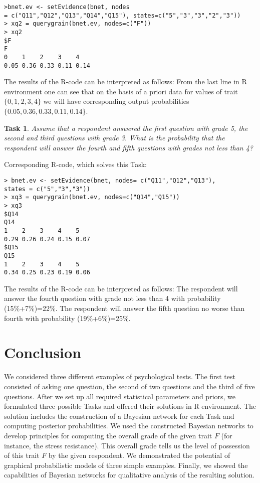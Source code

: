 \documentclass[12pt]{article}
\newtheorem{task}{Task}[section]
\begin{document}
\begin{verbatim}
>bnet.ev <- setEvidence(bnet, nodes 
= c("Q11","Q12","Q13","Q14","Q15"), states=c("5","3","3","2","3"))
> xq2 = querygrain(bnet.ev, nodes=c("F"))
> xq2
$F
F
0    1    2    3    4
0.05 0.36 0.33 0.11 0.14
\end{verbatim}
%
The results of the R-code can be interpreted as follows: From the last line in R environment one can see that on the basis of a priori data for values of trait $\{0,1,2,3,4\}$ we will have corresponding output probabilities $\{0.05, 0.36, 0.33, 0.11, 0.14\}$.
%
\begin{task}
\label{t:2quest4}
Assume that a respondent answered the first question with grade 5, the second and third questions with grade 3. What is the probability that the respondent will answer the fourth and fifth questions with grades not less than 4? 
\end{task}
%
Corresponding R-code, which solves this Task:
%
\begin{verbatim}
> bnet.ev <- setEvidence(bnet, nodes= c("Q11","Q12","Q13"),
states = c("5","3","3"))
> xq3 = querygrain(bnet.ev, nodes=c("Q14","Q15"))
> xq3
$Q14
Q14
1    2    3    4    5
0.29 0.26 0.24 0.15 0.07 
$Q15
Q15
1    2    3    4    5
0.34 0.25 0.23 0.19 0.06 
\end{verbatim}
%

The results of the R-code can be interpreted as follows: The respondent will answer the fourth question with grade not less than 4 with probability (15\%+7\%)=22\%. The respondent will answer the fifth question no worse than fourth with probability (19\%+6\%)=25\%.

%
\section{Conclusion}
%
We considered three different examples of psychological tests. The first test consisted of asking one question, the second of two questions and the third of five questions. After we set up all required statistical parameters and priors, we formulated three possible Tasks and offered their solutions in R environment. The solution includes the construction of a Bayesian network for each Task and computing posterior probabilities. 
We used the constructed Bayesian networks to develop principles for computing the overall grade of the given trait $F$ (for instance, the stress resistance). This overall grade tells us the level of possession of this trait $F$ by the given respondent. We demonstrated the potential of graphical probabilistic models of three simple examples. Finally, we showed the capabilities of Bayesian networks for qualitative analysis of the resulting solution.
\end{document}
